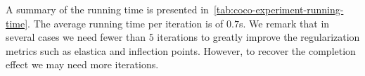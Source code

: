 \documentclass[review]{siamart220329}
\begin{document}
A summary of the running time is presented
in~\cref{tab:coco-experiment-running-time}. The average running time per
iteration is of $0.7$s. We remark that in several cases we need fewer than $5$
iterations to greatly improve the regularization metrics such as elastica and
inflection points. However, to recover the completion effect we may need more
iterations.
%
%
\begin{figure}
\center
{}


\end{figure}
\end{document}
